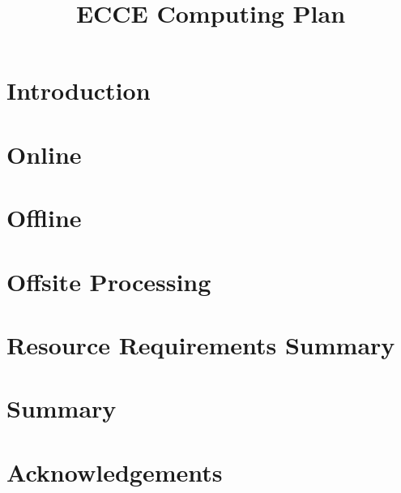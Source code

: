 \documentclass[longtitle,preprint,5p,times,twocolumn]{elsarticle}
\begin{document}
\begin{frontmatter}
\title{ECCE Computing Plan}
\def\theaffn{\arabic{affn}} %



\end{frontmatter}

\setcounter{tocdepth}{1}
\tableofcontents


\section {Introduction}
\label{sec:introduction}



\section {Online}
\label{sec:online}



\section {Offline}
\label{sec:offline}


\section {Offsite Processing}
\label{sec:offsite}


\section {Resource Requirements Summary}
\label{sec:resources}



\section{Summary}
\label{sec:executive_summary}


\section{Acknowledgements}
\label{acknowledgements}


%


%

%


 

\end{document}
